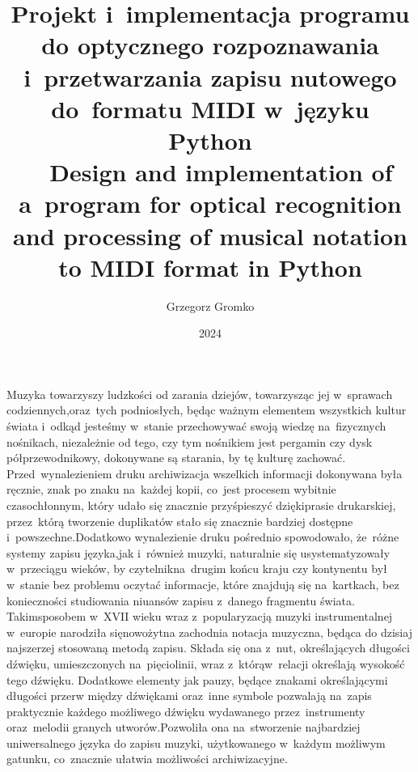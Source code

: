 \documentclass[xodstep]{wnspt}
\author      {Grzegorz Gromko}
\date        {2024}
\title{ Projekt i~implementacja programu do optycznego rozpoznawania i~przetwarzania zapisu nutowego do~formatu MIDI w~języku Python
\\{~}
Design and implementation of a~program for optical recognition and processing of musical notation to MIDI format in Python}
\begin{document}
\maketitle
\onehalfspacing
%



\introduction


Muzyka towarzyszy ludzkości od zarania dziejów, towarzysząc jej w~sprawach codziennych,\linebreak oraz~tych podniosłych, będąc ważnym elementem wszystkich kultur świata i~odkąd jesteśmy w~stanie przechowywać swoją wiedzę na~fizycznych nośnikach, niezależnie od tego, czy tym nośnikiem jest pergamin czy dysk półprzewodnikowy, dokonywane są starania, by tę kulturę zachować. Przed~wynalezieniem druku archiwizacja wszelkich informacji dokonywana była ręcznie, znak po znaku na~każdej kopii, co~jest procesem wybitnie czasochłonnym, który udało się znacznie przyśpieszyć dzięki\linebreak prasie drukarskiej, przez~którą tworzenie duplikatów stało się znacznie bardziej dostępne i~powszechne.\linebreak Dodatkowo wynalezienie druku pośrednio spowodowało, że~różne systemy zapisu języka,\linebreak jak i~również muzyki, naturalnie się usystematyzowały w~przeciągu wieków, by czytelnik\linebreak na~drugim końcu kraju czy kontynentu był w~stanie bez problemu oczytać informacje, które znajdują się na~kartkach, bez konieczności studiowania niuansów zapisu z~danego fragmentu świata. Takim\linebreak sposobem w~XVII wieku wraz z~popularyzacją muzyki instrumentalnej w~europie narodziła się\linebreak nowożytna zachodnia notacja muzyczna, będąca do dzisiaj najszerzej stosowaną metodą zapisu. Składa się ona z~nut, określających długości dźwięku, umieszczonych na~pięciolinii, wraz z~którą\linebreak w~relacji określają wysokość tego dźwięku. Dodatkowe elementy jak pauzy, będące znakami określającymi długości przerw między dźwiękami oraz~inne symbole pozwalają na~zapis praktycznie każdego możliwego dźwięku wydawanego przez~instrumenty oraz~melodii granych utworów.\linebreak Pozwoliła ona na~stworzenie najbardziej uniwersalnego języka do zapisu muzyki, użytkowanego w~każdym możliwym gatunku, co~znacznie ułatwia możliwości archiwizacyjne.
\end{document}
